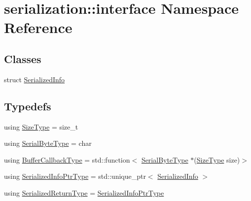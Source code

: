 \hypertarget{namespaceserialization_1_1interface}{}\section{serialization\+:\+:interface Namespace Reference}
\label{namespaceserialization_1_1interface}
\subsection*{Classes}
\begin{DoxyCompactItemize}
\item 
struct \hyperlink{structserialization_1_1interface_1_1_serialized_info}{Serialized\+Info}
\end{DoxyCompactItemize}
\subsection*{Typedefs}
\begin{DoxyCompactItemize}
\item 
using \hyperlink{namespaceserialization_1_1interface_a2ffaaa9b168f9cbcfe454ab036444403}{Size\+Type} = size\+\_\+t
\item 
using \hyperlink{namespaceserialization_1_1interface_a718748616a908c35e6080b71d7790a76}{Serial\+Byte\+Type} = char
\item 
using \hyperlink{namespaceserialization_1_1interface_ae1f3fc9ceb0366ab6a877a78ee7377a2}{Buffer\+Callback\+Type} = std\+::function$<$ \hyperlink{namespaceserialization_1_1interface_a718748616a908c35e6080b71d7790a76}{Serial\+Byte\+Type} $\ast$(\hyperlink{namespaceserialization_1_1interface_a2ffaaa9b168f9cbcfe454ab036444403}{Size\+Type} size)$>$
\item 
using \hyperlink{namespaceserialization_1_1interface_ab3413aa784e985f68876637844866ba1}{Serialized\+Info\+Ptr\+Type} = std\+::unique\+\_\+ptr$<$ \hyperlink{structserialization_1_1interface_1_1_serialized_info}{Serialized\+Info} $>$
\item 
using \hyperlink{namespaceserialization_1_1interface_a53410d9804c330ddfaf562ddc8e3c681}{Serialized\+Return\+Type} = \hyperlink{namespaceserialization_1_1interface_ab3413aa784e985f68876637844866ba1}{Serialized\+Info\+Ptr\+Type}
\end{DoxyCompactItemize}
